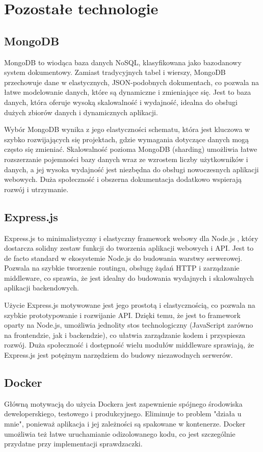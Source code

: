 \documentclass[shortabstract,inz]{iithesis}
\begin{document}
\newpage
\section{Pozostałe technologie}
\subsection{MongoDB}
MongoDB \cite{bib:mongo-db} to wiodąca baza danych NoSQL, klasyfikowana jako bazodanowy system dokumentowy. Zamiast tradycyjnych tabel i wierszy, MongoDB przechowuje dane w elastycznych, JSON-podobnych dokumentach, co pozwala na łatwe modelowanie danych, które są dynamiczne i zmieniające się. Jest to baza danych, która oferuje wysoką skalowalność i wydajność, idealna do obsługi dużych zbiorów danych i dynamicznych aplikacji.

Wybór MongoDB wynika z jego elastyczności schematu, która jest kluczowa w szybko rozwijających się projektach, gdzie wymagania dotyczące danych mogą często się zmieniać. Skalowalność pozioma MongoDB (sharding) umożliwia łatwe rozszerzanie pojemności bazy danych wraz ze wzrostem liczby użytkowników i danych, a jej wysoka wydajność jest niezbędna do obsługi nowoczesnych aplikacji webowych. Duża społeczność i obszerna dokumentacja dodatkowo wspierają rozwój i utrzymanie.

\subsection{Express.js}
Express.js \cite{bib:express-js} to minimalistyczny i elastyczny framework webowy dla Node.js \cite{bib:node-js}, który dostarcza solidny zestaw funkcji do tworzenia aplikacji webowych i API. Jest to de facto standard w ekosystemie Node.js do budowania warstwy serwerowej. Pozwala na szybkie tworzenie routingu, obsługę żądań HTTP i zarządzanie middleware, co sprawia, że jest idealny do budowania wydajnych i skalowalnych aplikacji backendowych.

Użycie Express.js motywowane jest jego prostotą i elastycznością, co pozwala na szybkie prototypowanie i rozwijanie API. Dzięki temu, że jest to framework oparty na Node.js, umożliwia jednolity stos technologiczny (JavaScript zarówno na frontendzie, jak i backendzie), co ułatwia zarządzanie kodem i przyspiesza rozwój. Duża społeczność i dostępność wielu modułów middleware sprawiają, że Express.js jest potężnym narzędziem do budowy niezawodnych serwerów.

\subsection{Docker}
Główną motywacją do użycia Dockera \cite{bib:docker} jest zapewnienie spójnego środowiska deweloperskiego, testowego i produkcyjnego. Eliminuje to problem "działa u mnie", ponieważ aplikacja i jej zależności są spakowane w kontenerze. Docker umożliwia też łatwe uruchamianie odizolowanego kodu, co jest szczególnie przydatne przy implementacji sprawdzaczki. 
\end{document}
